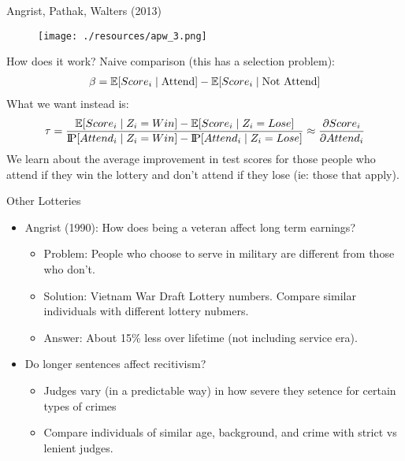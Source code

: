 \begin{frame}{Angrist, Pathak, Walters (2013)}
\begin{figure}
\centering
\texttt{[image: ./resources/apw\_3.png]}
\end{figure}
\end{frame}

\begin{frame}{How does it work?}
Naive comparison (this has a selection problem):
\begin{align*}
\beta = \mathbb{E}[Score_i \mid \text{Attend}] - \mathbb{E}[Score_i \mid  \text{Not Attend}] 
\end{align*}
What we want instead is:
\begin{align*}
\tau = \frac{\mathbb{E}[Score_i \mid Z_i = Win] - \mathbb{E}[Score_i \mid Z_i = Lose]}{\text{I\kern-0.15em P}[Attend_i \mid Z_i = Win] - \text{I\kern-0.15em P}[Attend_i \mid Z_i = Lose]} \approx \frac{\partial Score_i}{\partial Attend_i}
\end{align*}
We learn about the average improvement in test scores for those people who attend if they win the lottery and don't attend if they lose (ie: those that apply).\\
\end{frame}

\begin{frame}{Other Lotteries}
\begin{itemize}
\item Angrist (1990): How does being a veteran affect long term earnings?
\begin{itemize}
\item Problem: People who choose to serve in military are different from those who don't.
\item Solution: Vietnam War Draft Lottery numbers. Compare similar individuals with different lottery nubmers.
\item Answer: About 15\% less over lifetime (not including service era).
\end{itemize}
\item Do longer sentences affect recitivism?
\begin{itemize}
\item Judges vary (in a predictable way) in how severe they setence for certain types of crimes
\item Compare individuals of similar age, background, and crime with strict vs lenient judges.
\end{itemize}

\end{itemize}
\end{frame}



